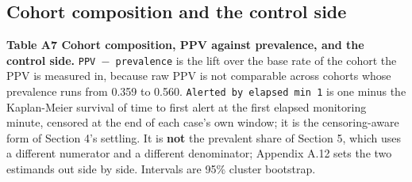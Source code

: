 \vspace{0.8em}

\subsection{Cohort composition and the control side}\label{cohort-composition-and-the-control-side}

\begin{minipage}{\linewidth}
\textbf{Table A7 \textbar{} Cohort composition, PPV against prevalence, and the control side.} \texttt{PPV\ $-$\ prevalence} is the lift over the base rate of the cohort the PPV is measured in, because raw PPV
is not comparable across cohorts whose prevalence runs from 0.359 to 0.560. \texttt{Alerted\ by\ elapsed\ min\ 1} is one minus the Kaplan-Meier survival of time to first alert at the first elapsed
monitoring minute, censored at the end of each case's own window; it is the censoring-aware form
of Section 4's settling. It is \textbf{not} the prevalent share of Section 5, which uses a
different numerator and a different denominator; Appendix A.12 sets the two estimands out side by
side. Intervals are 95\% cluster bootstrap.


\end{minipage}
